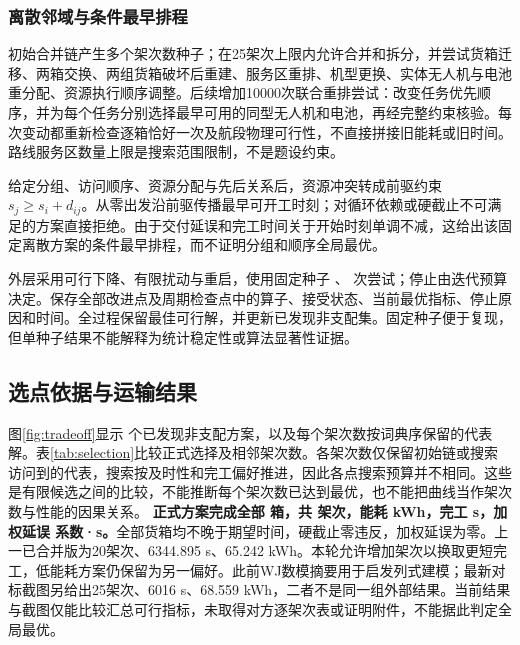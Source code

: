 \subsubsection{离散邻域与条件最早排程}
初始合并链产生多个架次数种子；在25架次上限内允许合并和拆分，并尝试货箱迁移、两箱交换、两组货箱破坏后重建、服务区重排、机型更换、实体无人机与电池重分配、资源执行顺序调整。后续增加10000次联合重排尝试：改变任务优先顺序，并为每个任务分别选择最早可用的同型无人机和电池，再经完整约束核验。每次变动都重新检查逐箱恰好一次及航段物理可行性，不直接拼接旧能耗或旧时间。路线服务区数量上限是搜索范围限制，不是题设约束。

给定分组、访问顺序、资源分配与先后关系后，资源冲突转成前驱约束 $s_j\ge s_i+d_{ij}$。从零出发沿前驱传播最早可开工时刻；对循环依赖或硬截止不可满足的方案直接拒绝。由于交付延误和完工时间关于开始时刻单调不减，这给出该固定离散方案的条件最早排程，而不证明分组和顺序全局最优。

外层采用可行下降、有限扰动与重启，使用固定种子 \SearchSeed{}、\QTwoIterations{} 次尝试；停止由迭代预算决定。保存全部改进点及周期检查点中的算子、接受状态、当前最优指标、停止原因和时间。全过程保留最佳可行解，并更新已发现非支配集。固定种子便于复现，但单种子结果不能解释为统计稳定性或算法显著性证据。

\subsection{选点依据与运输结果}
图\ref{fig:tradeoff}显示 \ParetoCount{} 个已发现非支配方案，以及每个架次数按词典序保留的代表解。表\ref{tab:selection}比较正式选择及相邻架次数。各架次数仅保留初始链或搜索访问到的代表，搜索按及时性和完工偏好推进，因此各点搜索预算并不相同。这些是有限候选之间的比较，不能推断每个架次数已达到最优，也不能把曲线当作架次数与性能的因果关系。
\textbf{正式方案完成全部 \NumBoxes{} 箱，共 \QTwoTrips{} 架次，能耗 \QTwoEnergy{} kWh，完工 \QTwoTime{} s，加权延误 \QTwoLate{} 系数·s。}全部货箱均不晚于期望时间，硬截止零违反，加权延误为零。上一已合并版为20架次、6344.895 s、65.242 kWh。本轮允许增加架次以换取更短完工，低能耗方案仍保留为另一偏好。此前WJ数模摘要\cite{wj}用于启发列式建模；最新对标截图\cite{benchmarkimage}另给出25架次、6016 s、68.559 kWh，二者不是同一组外部结果。当前结果与截图仅能比较汇总可行指标，未取得对方逐架次表或证明附件，不能据此判定全局最优。

